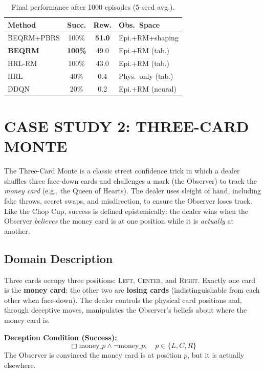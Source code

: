 \documentclass[letterpaper, 10 pt, conference]{ieeeconf}  %
\newcommand{\IBel}[1]{\ensuremath{\Box #1}}   %
\begin{document}
\begin{table}[ht]
\centering\small
\begin{tabular}{lccl}
\toprule
\textbf{Method} & \textbf{Succ.} & \textbf{Rew.} & \textbf{Obs.\ Space} \\
\midrule
BEQRM+PBRS & 100\% & \textbf{51.0} & Epi.+RM+shaping \\
\textbf{BEQRM} & \textbf{100\%} & 49.0 & Epi.+RM (tab.) \\
HRL-RM & 100\% & 43.0 & Epi.+RM (tab.) \\
HRL & 40\% & 0.4 & Phys.\ only (tab.) \\
DDQN & 20\% & 0.2 & Epi.+RM (neural) \\
\bottomrule
\end{tabular}
\caption{Final performance after 1000 episodes (5-seed avg.).}
\label{tab:comparison}
\end{table}

\section{CASE STUDY 2: THREE-CARD MONTE}
\label{sec:three-card-monte}

The Three-Card Monte is a classic street confidence trick in which a dealer shuffles three face-down cards and challenges a mark (the Observer) to track the \emph{money card} (e.g., the Queen of Hearts).
The dealer uses sleight of hand, including fake throws, secret swaps, and misdirection, to ensure the Observer loses track.
Like the Chop Cup, success is defined epistemically: the dealer wins when the Observer \emph{believes} the money card is at one position while it is \emph{actually} at another.

\subsection{Domain Description}

Three cards occupy three positions: \textsc{Left}, \textsc{Center}, and \textsc{Right}.
Exactly one card is the \textbf{money card}; the other two are \textbf{losing cards} (indistinguishable from each other when face-down).
The dealer controls the physical card positions and, through deceptive moves, manipulates the Observer's beliefs about where the money card is.

\textbf{Deception Condition (Success):}
\[
    \IBel{\text{money}\_p} \land \neg\text{money}\_p,
    \quad p \in \{L, C, R\}
\]
The Observer is convinced the money card is at position $p$, but it is actually elsewhere.
\end{document}
